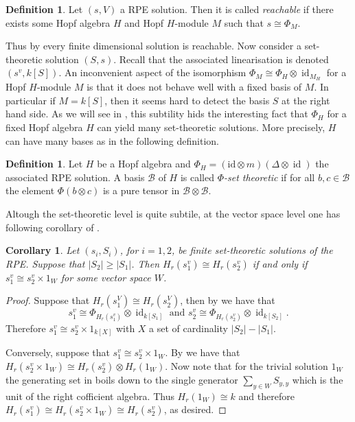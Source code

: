 \documentclass[a4paper,10pt]{amsart}
\newtheorem{corollary}[lemma]{Corollary}
\theoremstyle{definition}
\newtheorem{definition}[lemma]{Definition}
\theoremstyle{remark}
\DeclareMathOperator{\id}{id}
\newcommand\D{\Delta}
\newcommand\ot{\otimes}
\newcommand\mc{\mathcal}
\begin{document}
\begin{definition}\label{def reachable sol}
Let $(s,V)$ a RPE solution. Then it is called \emph{reachable} if there exists some Hopf algebra $H$ and Hopf $H$-module $M$ such that $s \cong \Phi_M.$
\end{definition}

Thus by  every finite dimensional solution is reachable. Now consider a set-theoretic solution $(S,s)$. Recall that the associated linearisation is denoted $(s^v,k[S])$. An inconvenient aspect of the isomorphism $\Phi_M \cong \Phi_H \ot \id_{M_H}$ for a Hopf $H$-module $M$ is that it does not behave well with a fixed basis of $M$. In particular if $M = k[S]$, then it seems hard to detect the basis $S$ at the right hand side. As we will see in , this subtility hids the interesting fact that $\Phi_H$ for a fixed Hopf algebra $H$ can yield many set-theoretic solutions. More precisely, $H$ can have many bases as in the following definition.

\begin{definition}\label{phi set theoretic def}
Let $H$ be a Hopf algebra and $\Phi_H=(\mathrm{id}\otimes m)(\D \otimes \id)$ the associated RPE solution.
A basis $\mc{B}$ of $H$ is called \emph{$\Phi$-set theoretic} if for all $b,c\in \mc{B}$ the element $\Phi(b\otimes c)$ is a pure tensor in $\mc{B}\otimes \mc{B}$.
\end{definition}

Altough the set-theoretic level is quite subtile, at the vector space level one has following corollary of .

\begin{corollary}\label{Vs sol versus Hopf alg}
Let $(s_i,S_i)$, for $i=1,2$, be finite set-theoretic solutions of the RPE. Suppose that $|S_2|\geq |S_1|$. Then $H_r(s_1^{v}) \cong H_r(s_2^{v})$ if and only if $s_1^v \cong s_2^v\times 1_W$ for some vector space $W$.
\end{corollary}
\begin{proof}
    Suppose that $H_r(s_1^{V}) \cong H_r(s_2^{V})$, then by  we have that 
    $$s_1^v \cong \Phi_{H_r(s_1^{v})} \ot \id_{k[S_1]} \text{ and } s_2^v \cong \Phi_{H_r(s_2^{v})} \ot \id_{k[S_2]}.$$
    Therefore $s_1^v \cong s_2^v\times 1_{k[X]}$ with $X$ a set of cardinality $|S_2| - |S_1|.$

    Conversely, suppose that  $s_1^v \cong s_2^v\times 1_W$. By  we have that $H_r(s_2^v\times 1_W) \cong H_r(s_2^v) \ot H_r(1_W)$. Now note that for the trivial solution $1_W$ the generating set in  boils down to the single generator $\sum_{y \in W} S_{y,y}$ which is the unit of the right cofficient algebra. Thus $H_r(1_W) \cong k$ and therefore $H_r(s_1^v) \cong H_r(s_2^v\times 1_W) \cong H_r(s_2^v)$, as desired.
\end{proof}
\end{document}

